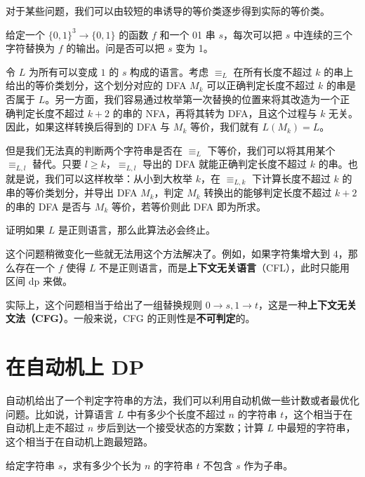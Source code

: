 对于某些问题，我们可以由较短的串诱导的等价类逐步得到实际的等价类。
\begin{example}
    给定一个 $\{0,1\}^3\to \{0,1\}$ 的函数 $f$ 和一个 01 串 $s$，每次可以把 $s$ 中连续的三个字符替换为 $f$ 的输出。问是否可以把 $s$ 变为 1。
\end{example}
\begin{solution}
    令 $L$ 为所有可以变成 $1$ 的 $s$ 构成的语言。考虑 $\equiv_L$ 在所有长度不超过 $k$ 的串上给出的等价类划分，这个划分对应的 DFA $M_k$ 可以正确判定长度不超过 $k$ 的串是否属于 $L$。另一方面，我们容易通过枚举第一次替换的位置来将其改造为一个正确判定长度不超过 $k+2$ 的串的 NFA，再将其转为 DFA，且这个过程与 $k$ 无关。因此，如果这样转换后得到的 DFA 与 $M_k$ 等价，我们就有 $L(M_k)=L$。
    
    但是我们无法真的判断两个字符串是否在 $\equiv_L$ 下等价，我们可以将其用某个 $\equiv_{L,l}$ 替代。只要 $l\ge k$，$\equiv_{L,l}$ 导出的 DFA 就能正确判定长度不超过 $k$ 的串。也就是说，我们可以这样枚举：从小到大枚举 $k$，在 $\equiv_{L,k}$ 下计算长度不超过 $k$ 的串的等价类划分，并导出 DFA $M_k$，判定 $M_k$ 转换出的能够判定长度不超过 $k+2$ 的串的 DFA 是否与 $M_k$ 等价，若等价则此 DFA 即为所求。
\end{solution}
\begin{exercise}
    证明如果 $L$ 是正则语言，那么此算法必会终止。
\end{exercise}
\begin{remark}
    这个问题稍微变化一些就无法用这个方法解决了。例如，如果字符集增大到 $4$，那么存在一个 $f$ 使得 $L$ 不是正则语言，而是\textbf{上下文无关语言}（CFL），此时只能用区间 dp 来做。
    
    实际上，这个问题相当于给出了一组替换规则 $0\to s,1\to t$，这是一种\textbf{上下文无关文法（CFG）}。一般来说，CFG 的正则性是\textbf{不可判定}的。
\end{remark}

\section{在自动机上 DP}

自动机给出了一个判定字符串的方法，我们可以利用自动机做一些计数或者最优化问题。比如说，计算语言 $L$ 中有多少个长度不超过 $n$ 的字符串 $t$，这个相当于在自动机上走不超过 $n$ 步后到达一个接受状态的方案数；计算 $L$ 中最短的字符串，这个相当于在自动机上跑最短路。

\begin{example}[禁止子串计数]
    给定字符串 $s$，求有多少个长为 $n$ 的字符串 $t$ 不包含 $s$ 作为子串。
\end{example}

